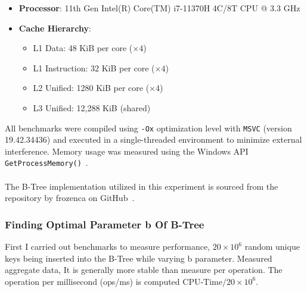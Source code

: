 \documentclass[12pt]{article}
\begin{document}
\begin{itemize}
	\item \textbf{Processor}: 11th Gen Intel(R) Core(TM) i7-11370H 4C/8T CPU @ 3.3 GHz
	\item \textbf{Cache Hierarchy}:
	\begin{itemize}
		\item L1 Data: 48 KiB per core (\(\times 4\))
		\item L1 Instruction: 32 KiB per core (\(\times 4\))
		\item L2 Unified: 1280 KiB per core (\(\times 4\))
		\item L3 Unified: 12,288 KiB (shared)
	\end{itemize}
\end{itemize}

All benchmarks were compiled using \texttt{-Ox} optimization level with \texttt{MSVC} (version 19.42.34436) and executed in a single-threaded environment to minimize external interference. Memory usage was measured using the Windows API \texttt{GetProcessMemory()}~\cite{getprocessmemoryinfo}.\\
\\
The B-Tree implementation utilized in this experiment is sourced from the repository by frozenca
on GitHub~\cite{btree_github}.

\subsubsection*{Finding Optimal Parameter b Of B-Tree}
First I carried out benchmarks to measure performance, $20 \times 10^6$ random unique keys being inserted into the B-Tree while varying b parameter. Measured aggregate data, It is generally more stable than measure per operation. The operation per millisecond (ops/ms) is computed $\text{CPU-Time}/ 20 \times 10^6$.
\end{document}
